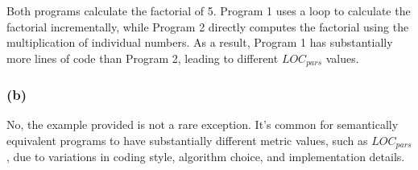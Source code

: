 \documentclass[a4paper]{scrartcl}
\begin{document}
\subsubsection*{}
Both programs calculate the factorial of 5.
Program 1 uses a loop to calculate the factorial incrementally,
while Program 2 directly computes the factorial using the multiplication of individual numbers.
As a result, Program 1 has substantially more lines of code than Program 2, leading to different $LOC_{pars}$ values.

\subsubsection*{(b)}
No, the example provided is not a rare exception.
It's common for semantically equivalent programs to have substantially different metric values, such as $LOC_{pars}$,
due to variations in coding style, algorithm choice, and implementation details.
\end{document}
